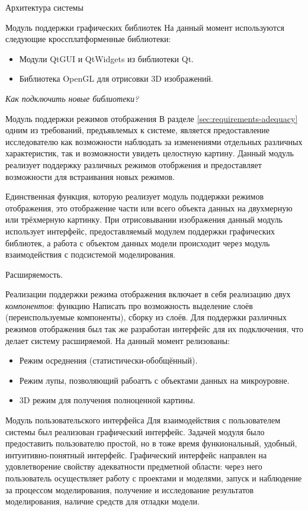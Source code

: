 \documentclass[a4paper,12pt]{extarticle}
\begin{document}
\begin{section}{Архитектура системы}
\begin{subsection}{Модуль поддержки графических библиотек}
    На данный момент используются следующие кроссплатформенные библиотеки:
    \begin{itemize}
        \item Модули QtGUI и QtWidgets из библиотеки Qt.
        \item Библиотека OpenGL для отрисовки 3D изображений.
    \end{itemize}
    \textit{Как подключить новые библиотеки?}
\end{subsection}

\begin{subsection}{Модуль поддержки режимов отображения}
    В разделе \ref{sec:requirements-adequacy} одним из требований, предъявлемых к системе, является предоставление исследователю как возможности наблюдать за изменениями отдельных различных характеристик, так и возможности увидеть целостную картину. Данный модуль реализует поддержку различных режимов отобржения и предоставляет возможности для встраивания новых режимов.

    Единственная функция, которую реализует модуль поддержки режимов отображения, это отображение части или всего объекта данных на двухмерную или трёхмерную картинку. При отрисовывании изображения данный модуль использует интерфейс, предоставляемый модулем поддержки графических библиотек, а работа с объектом данных модели происходит через модуль взаимодействия с подсистемой моделирования. 

    Расширяемость.

    Реализации поддержки режима отображения включает в себя реализацию двух \textit{компонентов}: функцию
    Написать про возможность выделение слоёв (переиспользуемые компоненты), сборку из слоёв.
    Для поддержки различных режимов отображения был так же разработан интерфейс для их подключения, что делает систему расширяемой. На данный момент релизованы:
    \begin{itemize}
        \item Режим осреднения (статистически-обобщённый).
        \item Режим лупы, позволяющий рабоатть с объектами данных на микроуровне.
        \item 3D режим для получения полноценной картины.
    \end{itemize}
\end{subsection}

\begin{subsection}{Модуль пользовательского интерфейса}
    Для взаимодействия с пользователем системы был реализован графический интерфейс. Задачей модуля было предоставить пользователю простой, но в тоже время функиональный, удобный, интуитивно-понятный интерфейс. Графический интерфейс направлен на удовлетворение свойству адекватности предметной области: через него пользователь осуществляет работу с проектами и моделями, запуск и наблюдение за процессом моделирования, получение и исследование результатов моделирования, наличие средств для отладки модели.
    

\end{subsection}
\end{section}
\end{document}
